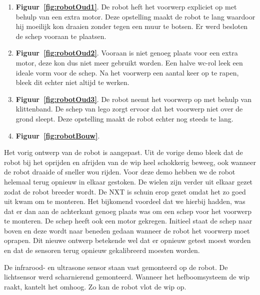 \documentclass[tt3]{penoverslag}
\begin{document}
\begin{enumerate}
\item \textbf{Figuur~\ref{fig:robotOud1}}. De robot heft het voorwerp expliciet op met behulp van een extra motor. Deze opstelling maakt de robot te lang waardoor hij moeilijk kon draaien zonder tegen een muur te botsen. Er werd besloten de schep vooraan te plaatsen.
\item \textbf{Figuur~\ref{fig:robotOud2}}. Vooraan is niet genoeg plaats voor een extra motor, deze kon dus niet meer gebruikt worden. Een halve wc-rol leek een ideale vorm voor de schep. Na het voorwerp een aantal keer op te rapen, bleek dit echter niet altijd te werken.
\item \textbf{Figuur~\ref{fig:robotOud3}}. De robot neemt het voorwerp op met behulp van klittenband. De schep van lego zorgt ervoor dat het voorwerp niet over de grond sleept. Deze opstelling maakt de robot echter nog steeds te lang.
\item \textbf{Figuur~\ref{fig:robotBouw}}. %
\end{enumerate}


Het vorig ontwerp van de robot is aangepast. Uit de vorige demo bleek dat de robot bij het oprijden en afrijden van de wip heel schokkerig beweeg, ook wanneer de robot draaide of sneller wou rijden. Voor deze demo hebben we de robot helemaal terug opnieuw in elkaar gestoken. De wielen zijn verder uit elkaar gezet zodat de robot breeder wordt. De NXT is schuin erop gezet omdat het zo goed uit kwam om te monteren. Het bijkomend voordeel dat we hierbij hadden, was dat er dan aan de achterkant genoeg plaats was om een schep voor het voorwerp te monteren. De schep heeft ook een motor gekregen. Initieel staat de schep naar boven en deze wordt naar beneden gedaan wanneer de robot het voorwerp moet oprapen.  Dit nieuwe ontwerp betekende wel dat er opnieuw getest moest worden en dat de sensoren terug opnieuw gekalibreerd moesten worden.

De infrarood- en ultrasone sensor staan vast gemonteerd op de robot. De lichtsensor werd scharnierend gemonteerd. Wanneer het hefboomsysteem de wip raakt, kantelt het omhoog. Zo kan de robot vlot de wip op.

\end{document}
